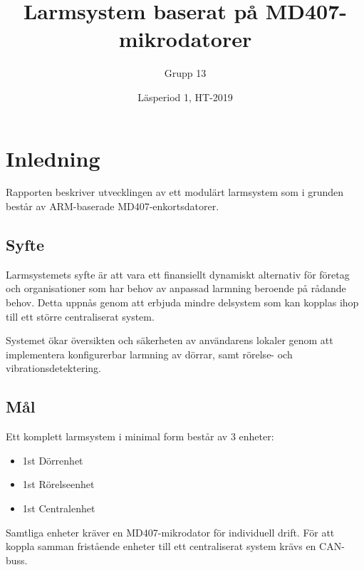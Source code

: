 \documentclass{article}
\title{Larmsystem baserat på MD407-mikrodatorer}
\author{Grupp 13}
\date{Läsperiod 1, HT-2019}
\begin{document}
\maketitle
{}
\newpage

\tableofcontents
\newpage



\section{Inledning}
Rapporten beskriver utvecklingen av ett modulärt larmsystem som i grunden
 \newline består av ARM-baserade MD407-enkortsdatorer.

\subsection{Syfte} %
Larmsystemets syfte är att vara ett finansiellt dynamiskt alternativ för företag och organisationer som har behov av anpassad larmning beroende på rådande behov. Detta uppnås genom att erbjuda mindre delsystem som kan kopplas ihop till ett större centraliserat system.

Systemet ökar översikten och säkerheten av användarens lokaler genom \newline att 
implementera konfigurerbar larmning av dörrar, samt rörelse- och vibrationsdetektering.

\subsection{Mål} %
Ett komplett larmsystem i minimal form består av 3 enheter:
\begin{itemize}
    \item 1st Dörrenhet
    \item 1st Rörelseenhet
    \item 1st Centralenhet
\end{itemize}
Samtliga enheter kräver en MD407-mikrodator för individuell drift. För att koppla samman fristående enheter till ett centraliserat system krävs en CAN-buss.
\end{document}
